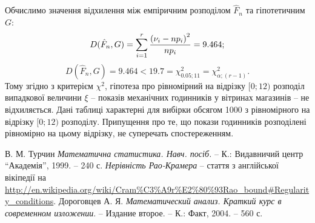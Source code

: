 \documentclass[12pt]{article} %
\begin{document}
	Обчислимо значення відхилення між емпіричним розподілом $\hat{F}_n$ та гіпотетичним $G$:
	\[D(\hat{F}_n,G)=\sum_{i=1}^r\frac{\mybra{\nu_i-np_i}^2}{np_i}=9.464;\]
	\[D(\hat{F}_n,G)=9.464<19.7=\chi_{0.05;11}^2=\chi^2_{\alpha;(r-1)}.\]
	Тому згідно з критерієм $\chi^2$, гіпотеза про рівномірний на відрізку $[0;12)$ розподіл випадкової величини $\xi$ -- показів механічних
	годинників у вітринах магазинів -- не відхиляється. Дані таблиці характерні для вибірки обсягом 1000 з рівномірного на відрізку $[0;12)$
	розподілу. Припущення про те, що покази годинників розподілені рівномірно на цьому відрізку, не суперечать спостереженням.
\begin{thebibliography}{9}
В. М. Турчин \emph{Математична статистика. Навч. посіб.} --
К.: Видавничий центр ``Академія'', 1999. -- 240 с.
{\em Нерівність Рао-Крамера} -- стаття з англійської вікіпедії на
\url{http://en.wikipedia.org/wiki/Cram%C3%A9r%E2%80%93Rao_bound#Regularity_conditions}.
Дороговцев А. Я. {\em Математический анализ. Краткий курс в современном изложении}. -- Издание второе. --
	К.: Факт, 2004. -- 560 с.
\end{thebibliography}
\end{document}
